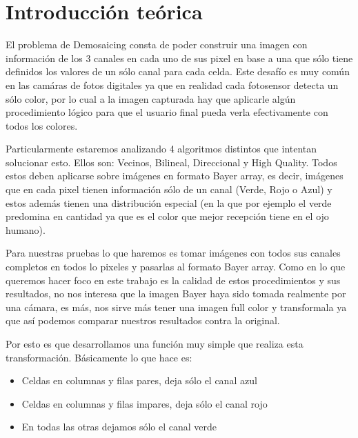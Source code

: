 \section{Introducci\'on te\'orica}

El problema de Demosaicing consta de poder construir una imagen con información de los 3 canales en cada uno de sus pixel en base a una que sólo tiene definidos los valores de un sólo canal para cada celda. Este desafío es muy común en las camáras de fotos digitales ya que en realidad cada fotosensor detecta un sólo color, por lo cual a la imagen capturada hay que aplicarle algún procedimiento lógico para que el usuario final pueda verla efectivamente con todos los colores.

Particularmente estaremos analizando 4 algoritmos distintos que intentan solucionar esto. Ellos son: Vecinos, Bilineal, Direccional y High Quality. Todos estos deben aplicarse sobre imágenes en formato Bayer array, es decir, imágenes que en cada pixel tienen información sólo de un canal (Verde, Rojo o Azul) y estos además tienen una distribución especial (en la que por ejemplo el verde predomina en cantidad ya que es el color que mejor recepción tiene en el ojo humano).

Para nuestras pruebas lo que haremos es tomar imágenes con todos sus canales completos en todos lo pixeles y pasarlas al formato Bayer array. Como en lo que queremos hacer foco en este trabajo es la calidad de estos procedimientos y sus resultados, no nos interesa que la imagen Bayer haya sido tomada realmente por una cámara, es más, nos sirve más tener una imagen full color y transformala ya que así podemos comparar nuestros resultados contra la original.

Por esto es que desarrollamos una función muy simple que realiza esta transformación. Básicamente lo que hace es: 
\begin{itemize}
\item Celdas en columnas y filas pares, deja sólo el canal azul
\item Celdas en columnas y filas impares, deja sólo el canal rojo
\item En todas las otras dejamos sólo el canal verde
\end{itemize}   


